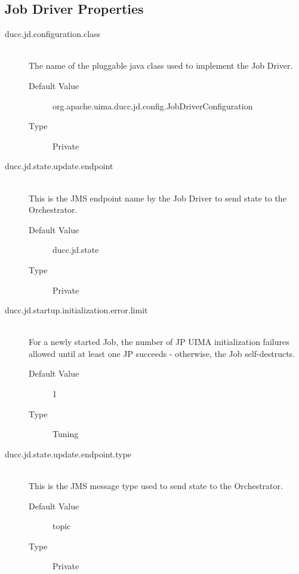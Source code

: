    
\subsection{Job Driver Properties}
    \begin{description}
        \item[ducc.jd.configuration.class] \hfill \\
          The name of the pluggable java class used to implement the Job Driver. 
          \begin{description}
            \item[Default Value] org.apache.uima.ducc.jd.config.JobDriverConfiguration 
            \item[Type] Private 
          \end{description}
          
        \item[ducc.jd.state.update.endpoint] \hfill \\
          This is the JMS endpoint name by the Job Driver to send state to the Orchestrator. 
          \begin{description}
            \item[Default Value] ducc.jd.state               
            \item[Type] Private 
          \end{description}
            
        \item[ducc.jd.startup.initialization.error.limit] \hfill \\
          For a newly started Job, the number of JP UIMA initialization failures
          allowed until at least one JP succeeds - otherwise, the Job self-destructs.
          \begin{description}
            \item[Default Value] 1     
            \item[Type] Tuning
          \end{description}
            

        \item[ducc.jd.state.update.endpoint.type] \hfill \\
          This is the JMS message type used to send state to the Orchestrator. 
          \begin{description}            
            \item[Default Value] topic 
            \item[Type] Private 
          \end{description}
          


\end{description}
